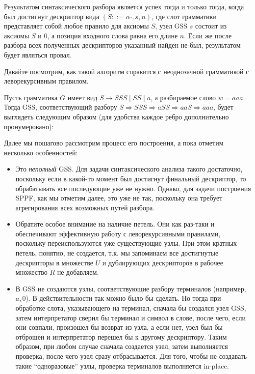 Результатом синтаксического разбора является успех тогда и только тогда, когда был достигнут дескриптор вида $ (S ::= \alpha \cdot, s, n) $, где слот грамматики представляет собой любое правило для аксиомы $ S $, узел GSS $ s $ состоит из аксиомы $ S $ и 0, а позиция входного слова равна его длине $ n $. Если же после разбора всех полученных дескрипторов указанный найден не был, результатом будет являться провал.

Давайте посмотрим, как такой алгоритм справится с неоднозачной грамматикой с леворекурсивным правилом.

\begin{example}
  \label{gll:example1}
  Пусть грамматика $ G $ имеет вид $ S \to SSS \mid SS \mid a $, а разбираемое слово $ w = aaa $. Тогда GSS, соответствующий разбору $S \Rightarrow SSS \Rightarrow aSS \Rightarrow aaS \Rightarrow aaa$, будет выглядеть следующим образом (для удобства каждое ребро дополнительно пронумеровано):

  \begin{center}
    
  \end{center}

  Далее мы пошагово рассмотрим процесс его построения, а пока отметим несколько особенностей:

  \begin{itemize}
    \item Это \textit{неполный} GSS. Для задачи синтаксического анализа такого достаточно, поскольку если в какой-то момент был достигнут финальный дескриптор, то обрабатывать все последующие уже не нужно. Однако, для задачи построения SPPF, как мы отметим далее, это уже не так, поскольку она требует агрегирования всех возможных путей разбора.

    \item Обратите особое внимание на наличие петель. Они как раз-таки и обеспечивают эффективную работу с леворекурсивными правилами, поскольку переиспользуются уже существующие узлы. При этом кратных петель, понятно, не создается, т.к. мы запоминаем все достигнутые дескрипторы в множестве $ U $ и дублирующих дескрипторов в рабочее множество $ R $ не добавляем.

    \item В GSS не создаются узлы, соответствующие разбору терминалов (например, $a, 0$). В действительности так можно было бы сделать. Но тогда при обработке слота, указывающего на терминал, сначала бы создался узел GSS, затем интерпретатор сверил бы терминал и символ в слове, после чего, если они совпали, произошел бы возврат из узла, а если нет, узел был бы отброшен и интерпретатор перешел бы к другому дескриптору. Таким образом, при любом случае сначала создается узел, затем выполняется проверка, после чего узел сразу отбрасывается. Для того, чтобы не создавать такие ``одноразовые'' узлы, проверка терминалов выполняется in-place.
  \end{itemize}


\end{example}
